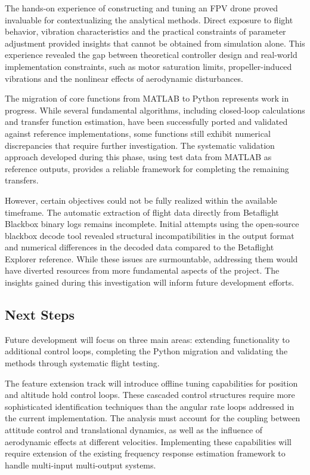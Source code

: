 \documentclass[a4paper,11pt]{scrartcl}
\begin{document}
The hands-on experience of constructing and tuning an FPV drone proved invaluable for contextualizing the analytical methods. Direct exposure to flight behavior, vibration characteristics and the practical constraints of parameter adjustment provided insights that cannot be obtained from simulation alone. This experience revealed the gap between theoretical controller design and real-world implementation constraints, such as motor saturation limits, propeller-induced vibrations and the nonlinear effects of aerodynamic disturbances.

The migration of core functions from MATLAB to Python represents work in progress. While several fundamental algorithms, including closed-loop calculations and transfer function estimation, have been successfully ported and validated against reference implementations, some functions still exhibit numerical discrepancies that require further investigation. The systematic validation approach developed during this phase, using test data from MATLAB as reference outputs, provides a reliable framework for completing the remaining transfers.

However, certain objectives could not be fully realized within the available timeframe. The automatic extraction of flight data directly from Betaflight Blackbox binary logs remains incomplete. Initial attempts using the open-source blackbox decode tool revealed structural incompatibilities in the output format and numerical differences in the decoded data compared to the Betaflight Explorer reference. While these issues are surmountable, addressing them would have diverted resources from more fundamental aspects of the project. The insights gained during this investigation will inform future development efforts.



\subsection{Next Steps}

Future development will focus on three main areas: extending functionality to additional control loops, completing the Python migration and validating the methods through systematic flight testing.

The feature extension track will introduce offline tuning capabilities for position and altitude hold control loops. These cascaded control structures require more sophisticated identification techniques than the angular rate loops addressed in the current implementation. The analysis must account for the coupling between attitude control and translational dynamics, as well as the influence of aerodynamic effects at different velocities. Implementing these capabilities will require extension of the existing frequency response estimation framework to handle multi-input multi-output systems.
\end{document}
